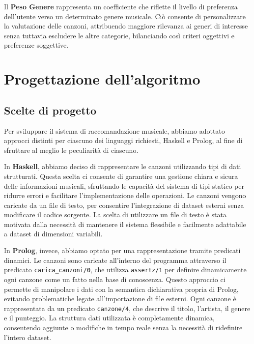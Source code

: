 \documentclass[a4paper,11pt]{article}
\begin{document}
\noindent
Il \textbf{Peso Genere} rappresenta un coefficiente che riflette il livello di preferenza dell’utente verso un determinato genere musicale. Ciò consente di personalizzare la valutazione delle canzoni, attribuendo maggiore rilevanza ai generi di interesse senza tuttavia escludere le altre categorie, bilanciando così criteri oggettivi e preferenze soggettive.  

\newpage
\section{Progettazione dell'algoritmo}
\subsection{Scelte di progetto}
Per sviluppare il sistema di raccomandazione musicale, abbiamo adottato approcci distinti per ciascuno dei linguaggi richiesti, Haskell e Prolog, al fine di sfruttare al meglio le peculiarità di ciascuno.

In \textbf{Haskell}, abbiamo deciso di rappresentare le canzoni utilizzando tipi di dati strutturati. Questa scelta ci consente di garantire una gestione chiara e sicura delle informazioni musicali, sfruttando le capacità del sistema di tipi statico per ridurre errori e facilitare l'implementazione delle operazioni. Le canzoni vengono caricate da un file di testo, per consentire l'integrazione di dataset esterni senza modificare il codice sorgente. La scelta di utilizzare un file di testo è stata motivata dalla necessità di mantenere il sistema flessibile e facilmente adattabile a dataset di dimensioni variabili.

In \textbf{Prolog}, invece, abbiamo optato per una rappresentazione tramite predicati dinamici. Le canzoni sono caricate all’interno del programma attraverso il predicato \texttt{carica\_canzoni/0}, che utilizza \texttt{assertz/1} per definire dinamicamente ogni canzone come un fatto nella base di conoscenza. Questo approccio ci permette di manipolare i dati con la semantica dichiarativa propria di Prolog, evitando problematiche legate all’importazione di file esterni. Ogni canzone è rappresentata da un predicato \texttt{canzone/4}, che descrive il titolo, l’artista, il genere e il punteggio. La struttura dati utilizzata è completamente dinamica, consentendo aggiunte o modifiche in tempo reale senza la necessità di ridefinire l’intero dataset.
\end{document}

